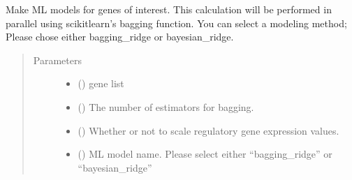 \documentclass[letterpaper,10pt,english]{sphinxmanual}
\begin{document}
\begin{fulllineitems}
\begin{fulllineitems}
\begin{quote}
\begin{description}
\begin{itemize}
\end{itemize}

\end{description}\end{quote}

\end{fulllineitems}


\begin{fulllineitems}
\label{\detokenize{modules/celloracle:celloracle.Net.fit_genes}}
Make ML models for genes of interest.
This calculation will be performed in parallel using scikit\sphinxhyphen{}learn’s bagging function.
You can select a modeling method; Please chose either bagging\_ridge or bayesian\_ridge.
\begin{quote}\begin{description}
\item[{Parameters}] \leavevmode\begin{itemize}
\item {} 
 () \textendash{} gene list

\item {} 
 () \textendash{} The number of estimators for bagging.

\item {} 
 () \textendash{} Whether or not to scale regulatory gene expression values.

\item {} 
 () \textendash{} ML model name. Please select either “bagging\_ridge” or “bayesian\_ridge”


\end{itemize}
\end{description}
\end{quote}
\end{fulllineitems}
\end{fulllineitems}
\end{document}
